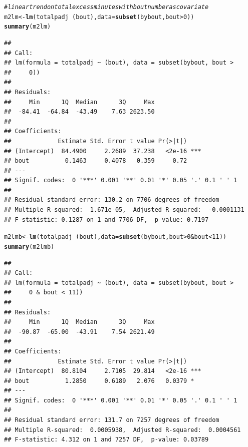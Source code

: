 \documentclass[11pt]{article}\usepackage[]{graphicx}\usepackage[]{color}
\makeatletter
\newcommand{\hlnum}[1]{\textcolor[rgb]{0.686,0.059,0.569}{#1}}%
\newcommand{\hlcom}[1]{\textcolor[rgb]{0.678,0.584,0.686}{\textit{#1}}}%
\newcommand{\hlopt}[1]{\textcolor[rgb]{0,0,0}{#1}}%
\newcommand{\hlstd}[1]{\textcolor[rgb]{0.345,0.345,0.345}{#1}}%
\newcommand{\hlkwb}[1]{\textcolor[rgb]{0.69,0.353,0.396}{#1}}%
\newcommand{\hlkwc}[1]{\textcolor[rgb]{0.333,0.667,0.333}{#1}}%
\newcommand{\hlkwd}[1]{\textcolor[rgb]{0.737,0.353,0.396}{\textbf{#1}}}%
\newenvironment{kframe}{%
 \def\at@end@of@kframe{}%
 \ifinner\ifhmode%
  \def\at@end@of@kframe{\end{minipage}}%
  \begin{minipage}{\columnwidth}%
 \fi\fi%
 \def\FrameCommand##1{\hskip\@totalleftmargin \hskip-\fboxsep
 \colorbox{shadecolor}{##1}\hskip-\fboxsep
     \hskip-\linewidth \hskip-\@totalleftmargin \hskip\columnwidth}%
 \MakeFramed {\advance\hsize-\width
   \@totalleftmargin\z@ \linewidth\hsize
   \@setminipage}}%
 {\par\unskip\endMakeFramed%
 \at@end@of@kframe}
\newenvironment{knitrout}{}{} %
\makeatother
\begin{document}
\begin{knitrout}
\color{fgcolor}\begin{kframe}
\begin{alltt}
\hlcom{#linear trend on total excess minutes with bout number as covariate}
\hlstd{m2lm} \hlkwb{<-} \hlkwd{lm}\hlstd{(totalpadj}\hlopt{~}\hlstd{(bout),}\hlkwc{data}\hlstd{=}\hlkwd{subset}\hlstd{(bybout,bout}\hlopt{>}\hlnum{0}\hlstd{))}
\hlkwd{summary}\hlstd{(m2lm)}
\end{alltt}
\begin{verbatim}
## 
## Call:
## lm(formula = totalpadj ~ (bout), data = subset(bybout, bout > 
##     0))
## 
## Residuals:
##     Min      1Q  Median      3Q     Max 
##  -84.41  -64.84  -43.49    7.63 2623.50 
## 
## Coefficients:
##             Estimate Std. Error t value Pr(>|t|)    
## (Intercept)  84.4900     2.2689  37.238   <2e-16 ***
## bout          0.1463     0.4078   0.359     0.72    
## ---
## Signif. codes:  0 '***' 0.001 '**' 0.01 '*' 0.05 '.' 0.1 ' ' 1
## 
## Residual standard error: 130.2 on 7706 degrees of freedom
## Multiple R-squared:  1.671e-05,	Adjusted R-squared:  -0.0001131 
## F-statistic: 0.1287 on 1 and 7706 DF,  p-value: 0.7197
\end{verbatim}
\begin{alltt}
\hlstd{m2lmb} \hlkwb{<-} \hlkwd{lm}\hlstd{(totalpadj}\hlopt{~}\hlstd{(bout),}\hlkwc{data}\hlstd{=}\hlkwd{subset}\hlstd{(bybout,bout}\hlopt{>}\hlnum{0}\hlopt{&}\hlstd{bout}\hlopt{<}\hlnum{11}\hlstd{))}
\hlkwd{summary}\hlstd{(m2lmb)}
\end{alltt}
\begin{verbatim}
## 
## Call:
## lm(formula = totalpadj ~ (bout), data = subset(bybout, bout > 
##     0 & bout < 11))
## 
## Residuals:
##     Min      1Q  Median      3Q     Max 
##  -90.87  -65.00  -43.91    7.54 2621.49 
## 
## Coefficients:
##             Estimate Std. Error t value Pr(>|t|)    
## (Intercept)  80.8104     2.7105  29.814   <2e-16 ***
## bout          1.2850     0.6189   2.076   0.0379 *  
## ---
## Signif. codes:  0 '***' 0.001 '**' 0.01 '*' 0.05 '.' 0.1 ' ' 1
## 
## Residual standard error: 131.7 on 7257 degrees of freedom
## Multiple R-squared:  0.0005938,	Adjusted R-squared:  0.0004561 
## F-statistic: 4.312 on 1 and 7257 DF,  p-value: 0.03789
\end{verbatim}
\end{kframe}
\end{knitrout}
\end{document}
